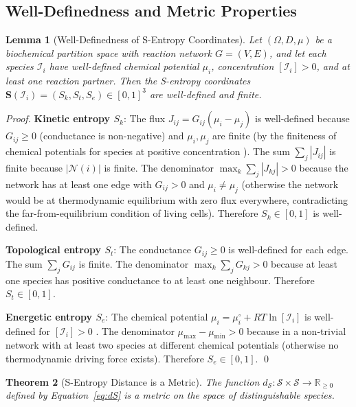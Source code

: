 \documentclass[11pt,twocolumn]{article}
\theoremstyle{plain}
\newtheorem{theorem}{Theorem}[section]
\newtheorem{lemma}[theorem]{Lemma}
\theoremstyle{definition}
\newcommand{\Sk}{S_k}
\newcommand{\St}{S_t}
\newcommand{\Se}{S_e}
\newcommand{\bS}{\mathbf{S}}
\newcommand{\dS}{d_{\mathcal{S}}}
\newcommand{\reals}{\mathbb{R}}
\begin{document}
\subsection{Well-Definedness and Metric Properties}

\begin{lemma}[Well-Definedness of S-Entropy Coordinates]
\label{lem:well_defined}
Let $(\Omega, D, \mu)$ be a biochemical partition space with reaction network
$G = (V, E)$, and let each species $\mathcal{I}_i$ have well-defined chemical
potential $\mu_i$, concentration $[\mathcal{I}_i] > 0$, and at least one
reaction partner. Then the S-entropy coordinates $\bS(\mathcal{I}_i) =
(\Sk, \St, \Se) \in [0,1]^3$ are well-defined and finite.
\end{lemma}

\begin{proof}
\textbf{Kinetic entropy $\Sk$}: The flux $J_{ij} = G_{ij}(\mu_i - \mu_j)$ is
well-defined because $G_{ij} \geq 0$ (conductance is non-negative) and $\mu_i,
\mu_j$ are finite (by the finiteness of chemical potentials for species at
positive concentration \cite{atkins2014physical}). The sum $\sum_j |J_{ij}|$ is
finite because $|\mathcal{N}(i)|$ is finite. The denominator $\max_k \sum_j
|J_{kj}| > 0$ because the network has at least one edge with $G_{ij} > 0$ and
$\mu_i \neq \mu_j$ (otherwise the network would be at thermodynamic equilibrium
with zero flux everywhere, contradicting the far-from-equilibrium condition of
living cells). Therefore $\Sk \in [0,1]$ is well-defined.

\textbf{Topological entropy $\St$}: The conductance $G_{ij} \geq 0$ is
well-defined for each edge. The sum $\sum_j G_{ij}$ is finite. The denominator
$\max_k \sum_j G_{kj} > 0$ because at least one species has positive
conductance to at least one neighbour. Therefore $\St \in [0,1]$.

\textbf{Energetic entropy $\Se$}: The chemical potential $\mu_i = \mu_i^\circ
+ RT \ln[\mathcal{I}_i]$ is well-defined for $[\mathcal{I}_i] > 0$
\cite{atkins2014physical}. The denominator $\mu_{\max} - \mu_{\min} > 0$
because in a non-trivial network with at least two species at different chemical
potentials (otherwise no thermodynamic driving force exists). Therefore
$\Se \in [0,1]$. \qed
\end{proof}

\begin{theorem}[S-Entropy Distance is a Metric]
\label{thm:metric}
The function $\dS: \mathcal{S} \times \mathcal{S} \to \reals_{\geq 0}$ defined
by Equation~\eqref{eq:dS} is a metric on the space of distinguishable species.
\end{theorem}
\end{document}

